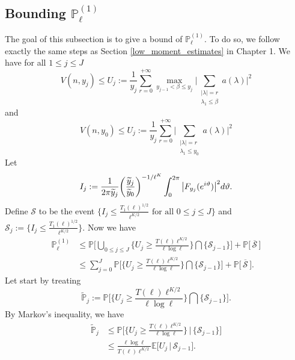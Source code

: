 \documentclass{article}
\begin{document}
\subsection{Bounding \texorpdfstring{$\mathbb{P}^{(1)}_{\ell}$}.}\label{section_P_1}
The goal of this subsection is to give a bound of  $\mathbb{P}^{(1)}_{\ell}$. To do so, we follow exactly the same steps as Section \ref{low_moment_estimates} in Chapter 1.  We have for all $1\leqslant j\leqslant J$
$$
V(n,y_j) \leqslant U_j:=\frac{1}{{y}_j} \sum_{r=0}^{+\infty}\max_{y_{j-1}<\beta\leqslant y_j} \bigg| \sum_{\substack{|\lambda|=r \\ \lambda_1 \leqslant \beta}} a(\lambda)\bigg|^2
$$
and
$$
V(n,y_0) \leqslant U_j:=\frac{1}{{y}_j} \sum_{r=0}^{+\infty} \bigg| \sum_{\substack{|\lambda|=r \\ \lambda_1 \leqslant y_0}} a(\lambda)\bigg|^2
$$
Let 
$$
I_j:= \frac{1}{2\pi\widetilde{y}_j} \bigg(\frac{\widetilde{y}_{j}}{\widetilde{y}_{0}}\bigg)^{-1/\ell^K}\int_{0}^{2\pi } \big|F_{y_j}({\rm e}^{i\vartheta})\big|^2{\rm d}\vartheta.
$$
Define $\mathcal{S}$ to be the event $\big\{ I_{j} \leqslant   \frac{T_1(\ell)^{1/2}}{\ell ^{K/2}} \text{ for all } 0 \leqslant j\leqslant J \big\}$ and $\mathcal{S}_j:=\big\{ I_{j} \leqslant   \frac{T_1(\ell)^{1/2}}{\ell ^{K/2}}  \big\} $.
Now we have
$$
\begin{aligned}
    \mathbb{P}_{\ell}^{(1)} & \leqslant  \mathbb{P}\bigg[ \bigcup_{0\leqslant j\leqslant J}\bigg\{ 
U_j \geqslant  \frac{T(\ell) \ell^{K/2} }{  \ell \log \ell}   \bigg\} \bigcap \big\{ \mathcal{S}_{j-1}\big\}\bigg] + \mathbb{P}\big[\,\overline{\mathcal{S}}\,\big]
\\ & \leqslant  \sum_{j=0}^{J} \mathbb{P}\bigg[ \bigg\{ 
U_j \geqslant  \frac{T(\ell) \ell^{K/2} }{  \ell \log \ell}   \bigg\} \bigcap \big\{ \mathcal{S}_{j-1}\big\}\bigg] + \mathbb{P}\big[\,\overline{\mathcal{S}}\,\big].
\end{aligned}
$$
Let start by treating
$$
\widetilde{\mathbb{P}}_j:=\mathbb{P}\bigg[ \bigg\{ 
U_j \geqslant  \frac{T(\ell) \ell^{K/2} }{  \ell \log \ell}   \bigg\} \bigcap \big\{ \mathcal{S}_{j-1}\big\}\bigg].
$$
By Markov's inequality, we have
$$
\begin{aligned}
\widetilde{\mathbb{P}}_j & \leqslant \mathbb{P}\bigg[ \bigg\{ 
U_j \geqslant  \frac{T(\ell) \ell^{K/2} }{  \ell \log \ell}   \bigg\}\,  \bigg| \, \big\{ \mathcal{S}_{j-1}\big\}\bigg] 
\\ & \leqslant \frac{\ell \log \ell}{T(\ell) \ell^{K/2}} \mathbb{E}\big[ U_j \, \big|\,\mathcal{S}_{j-1}\big].
\end{aligned}
$$
\end{document}
